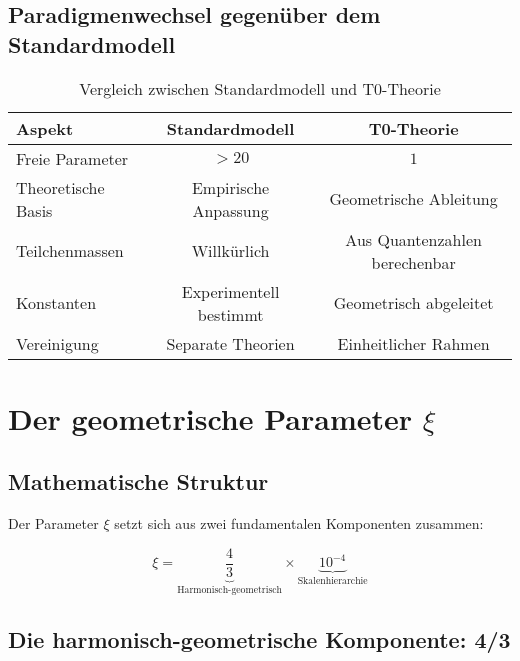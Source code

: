 \documentclass[12pt,a4paper]{article}
\newcommand{\xipar}{\xi}
\begin{document}
	\subsection{Paradigmenwechsel gegenüber dem Standardmodell}
	
	\begin{table}[htbp]
		\centering
		\begin{tabular}{lcc}
			\toprule
			\textbf{Aspekt} & \textbf{Standardmodell} & \textbf{T0-Theorie} \\
			\midrule
			Freie Parameter & $> 20$ & $1$ \\
			Theoretische Basis & Empirische Anpassung & Geometrische Ableitung \\
			Teilchenmassen & Willkürlich & Aus Quantenzahlen berechenbar \\
			Konstanten & Experimentell bestimmt & Geometrisch abgeleitet \\
			Vereinigung & Separate Theorien & Einheitlicher Rahmen \\
			\bottomrule
		\end{tabular}
		\caption{Vergleich zwischen Standardmodell und T0-Theorie}
	\end{table}
	
	\section{Der geometrische Parameter $\xipar$}
	
	\subsection{Mathematische Struktur}
	
	Der Parameter $\xipar$ setzt sich aus zwei fundamentalen Komponenten zusammen:
	
	\begin{equation}
		\xipar = \underbrace{\frac{4}{3}}_{\text{Harmonisch-geometrisch}} \times \underbrace{10^{-4}}_{\text{Skalenhierarchie}}
		\label{eq:xi_components}
	\end{equation}
	
	\subsection{Die harmonisch-geometrische Komponente: 4/3}
	
\end{document}
